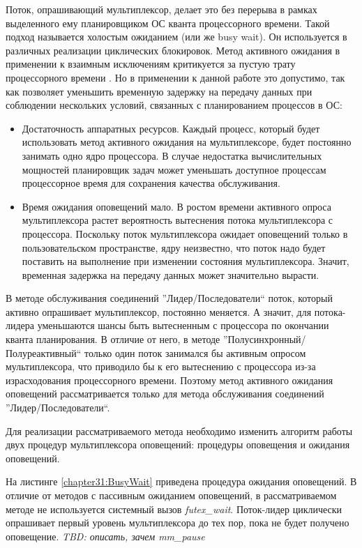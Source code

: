 Поток, опрашивающий мультиплексор, делает это без перерыва в рамках выделенного ему планировщиком ОС кванта процессорного времени. Такой подход называется холостым ожиданием (или же busy wait). Он используется в различных реализации циклических блокировок. Метод активного ожидания в применении к взаимным исключениям критикуется за пустую трату процессорного времени \cite{10.1007/3-540-44947-7_10, Ganjaliyev2019}. Но в применении к данной работе это допустимо, так как позволяет уменьшить временную задержку на передачу данных при соблюдении нескольких условий, связанных с планированием процессов в ОС:
\begin{itemize}
\item Достаточность аппаратных ресурсов. Каждый процесс, который будет использовать метод активного ожидания на мультиплексоре, будет постоянно занимать одно ядро процессора. В случае недостатка вычислительных мощностей планировщик задач может уменьшать доступное процессам процессорное время для сохранения качества обслуживания.
\item Время ожидания оповещений мало. В ростом времени активного опроса мультиплексора растет вероятность вытеснения потока мультиплексора с процессора. Поскольку поток мультиплексора ожидает оповещений только в пользовательском пространстве, ядру неизвестно, что поток надо будет поставить на выполнение при изменении состояния мультиплексора. Значит, временная задержка на передачу данных может значительно вырасти.
\end{itemize}

В методе обслуживания соединений ''Лидер/Последователи`` поток, который активно опрашивает мультиплексор, постоянно меняется. А значит, для потока-лидера уменьшаются шансы быть вытесненным с процессора по окончании кванта планирования. В отличие от него, в методе ''Полусинхронный/Полуреактивный`` только один поток занимался бы активным опросом мультиплексора, что приводило бы к его вытеснению с процессора из-за израсходования процессорного времени. Поэтому метод активного ожидания оповещений рассматривается только для метода обслуживания соединений ''Лидер/Последователи``.

Для реализации рассматриваемого метода необходимо изменить алгоритм работы двух процедур мультиплексора оповещений: процедуры оповещения и ожидания оповещений.

На листинге \ref{chapter31:BusyWait} приведена процедура ожидания оповещений. В отличие от методов с пассивным ожиданием оповещений, в рассматриваемом методе не используется системный вызов \textit{futex\_wait}. Поток-лидер циклически опрашивает первый уровень мультиплексора до тех пор, пока не будет получено оповещение. \textit{TBD: описать, зачем mm\_pause}

